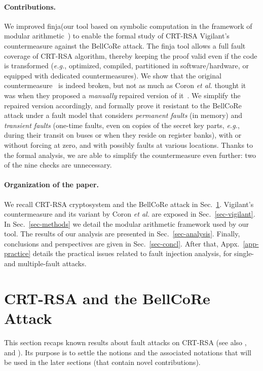 \documentclass[10pt]{article}
\theoremstyle{definition}
\theoremstyle{theorem}
\newcommand{\finja}{\textsf{finja}\xspace}
\newcommand{\eg}{\textit{e.g.}}
\newcommand{\etal}{\textit{et al.}\xspace}
\begin{document}
\paragraph{Contributions.}
We improved \finja (our tool based on symbolic computation in the framework of modular arithmetic~\cite{cryptoeprint:2013:506}) to enable the formal study of CRT-RSA Vigilant's countermeasure against the BellCoRe attack.
The \finja tool allows a full fault coverage of CRT-RSA algorithm, thereby keeping the proof valid even if the code is transformed (\eg, optimized, compiled, partitioned in software/hardware, or equipped with dedicated countermeasures).
We show that the original countermeasure~\cite{DBLP:conf/ches/Vigilant08} is indeed broken, but not as much as Coron \etal thought it was when they proposed a \emph{manually} repaired version of it~\cite{DBLP:conf/fdtc/CoronGMPV10}.
We simplify the repaired version accordingly, and formally prove it resistant to the BellCoRe attack under a fault model that considers \emph{permanent faults} (in memory) and \emph{transient faults} (one-time faults, even on copies of the secret key parts, \eg, during their transit on buses or when they reside on register banks), with or without forcing at zero, and with possibly faults at various locations.
Thanks to the formal analysis, we are able to simplify the countermeasure even further: two of the nine checks are unnecessary.

\paragraph{Organization of the paper.}
We recall CRT-RSA cryptosystem and the BellCoRe attack in Sec.~\ref{sec-rsa}.
Vigilant's countermeasure and its variant by Coron \etal are exposed in Sec.~\ref{sec-vigilant}.
In Sec.~\ref{sec-methods} we detail the modular arithmetic framework used by our tool.
The results of our analysis are presented in Sec.~\ref{sec-analysis}.
Finally, conclusions and perspectives are given in Sec.~\ref{sec-concl}.
After that, Appx.~\ref{app-practice} details the practical issues related to fault injection analysis, for single- and multiple-fault attacks.

\section{CRT-RSA and the BellCoRe Attack}
\label{sec-rsa}

This section recaps known results about fault attacks on CRT-RSA (see also \cite{koc_rsa}, \cite[Chap. 3]{Intro_HOST} and \cite[Chap. 7 \& 8]{fabook}).
Its purpose is to settle the notions and the associated notations that will be used in the later sections (that contain novel contributions).
\end{document}
